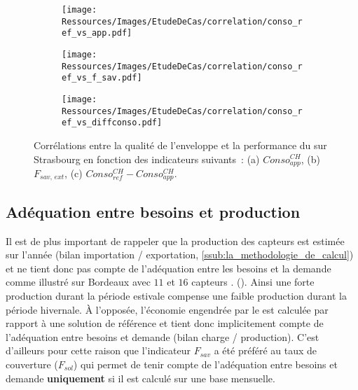 \begin{figure}
    \centering
    \begin{subfigure}[b]{0.313\textwidth}
        \centering
        \texttt{[image: Ressources/Images/EtudeDeCas/correlation/conso\_ref\_vs\_app.pdf]}
        \caption{}
        \label{fig:conso_ref_vs_app}
    \end{subfigure}
    \quad
    \begin{subfigure}[b]{0.313\textwidth}
        \centering
        \texttt{[image: Ressources/Images/EtudeDeCas/correlation/conso\_ref\_vs\_f\_sav.pdf]}
        \caption{}
        \label{fig:conso_ref_vs_f_sav}
    \end{subfigure}
    \quad
    \begin{subfigure}[b]{0.313\textwidth}
        \centering
        \texttt{[image: Ressources/Images/EtudeDeCas/correlation/conso\_ref\_vs\_diffconso.pdf]}
        \caption{}
        \label{fig:conso_ref_vs_diffconso}
    \end{subfigure}
    \caption[Corrélation entre la qualité de l’enveloppe et la performance du  sur Strasbourg]
             {Corrélations entre la qualité de l’enveloppe et la performance du 
              sur Strasbourg en fonction des indicateurs suivants~: (a) $Conso_{app}^{CH}$, (b) $F_{sav,\, ext}$,
              (c) $Conso_{ref}^{CH} - Conso_{app}^{CH}$.}
    \label{fig:conso_ref_vs_app_f_sav}
\end{figure}




\subsection{Adéquation entre besoins et production} %
\label{sub:adequation_entre_besoins_et_production}
Il est de plus important de rappeler que la production des capteurs  est estimée
sur l’année (bilan importation / exportation, \ref{ssub:la_methodologie_de_calcul}) et ne
tient donc pas compte de l’adéquation entre les besoins et la demande comme illustré sur
Bordeaux avec $11$ et $16$ capteurs .
(). Ainsi une forte production durant la période estivale
compense une faible production durant la période hivernale. À l’opposée, l’économie
engendrée par le  est calculée par rapport à une solution de référence et tient
donc implicitement compte de l’adéquation entre besoins et demande (bilan charge /
production). C’est d’ailleurs pour cette raison que l’indicateur $F_{sav}$ a été préféré
au taux de couverture ($F_{sol}$) qui permet de tenir compte de l’adéquation entre besoins
et demande \textbf{uniquement} si il est calculé sur une base mensuelle.

